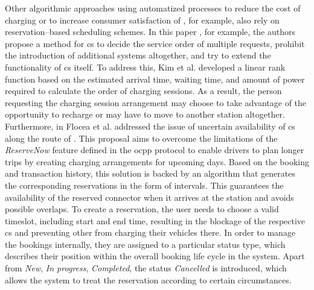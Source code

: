 \noindent Other algorithmic approaches using automatized processes to reduce the cost of charging or to increase consumer satisfaction of , for example, also rely on reservation--based scheduling schemes.
In this paper \cite{kim_efficient_2010}, for example, the authors propose a method for \acrshort{cs} to decide the service order of multiple requests, prohibit the introduction of additional systems altogether, and try to extend the functionality of \acrshort{cs} itself. 
To address this, Kim et al. developed a linear rank function based on the estimated arrival time, waiting time, and amount of power required to calculate the order of charging sessions.
As a result, the person requesting the charging session arrangement may choose to take advantage of the opportunity to recharge or may have to move to another station altogether. \\
\noindent Furthermore, in \cite{flocea_electric_2022} Flocea et al. addressed the issue of uncertain availability of \acrshort{cs} along the route of . 
This proposal aims to overcome the limitations of the \textit{ReserveNow} feature defined in the \acrshort{ocpp} protocol to enable drivers to plan longer trips by creating charging arrangements for upcoming days.
Based on the  booking and transaction history, this solution is backed by an algorithm that generates the corresponding reservations in the form of intervals.
This guarantees the availability of the reserved connector when it arrives at the station and avoids possible overlaps.
To create a reservation, the user needs to choose a valid timeslot, including start and end time, resulting in the blockage of the respective \acrshort{cs} and preventing other  from charging their vehicles there.
In order to manage the bookings internally, they are assigned to a particular status type, which describes their position within the overall booking life cycle in the system. 
Apart from \textit{New}, \textit{In progress}, \textit{Completed}, the status \textit{Cancelled} is introduced, which allows the system to treat the reservation according to certain circumstances.
